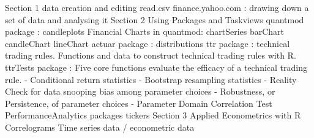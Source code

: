 Section 1
data creation and editing
read.csv
finance.yahoo.com : drawing down a set of data and analysing it
Section 2
Using Packages and Taskviews
quantmod package : candleplots 
Financial Charts in quantmod:
chartSeries
barChart
candleChart
lineChart
actuar package : distributions
ttr package : technical trading rules. Functions and data to construct technical trading rules with R.
ttrTests package : Five core functions evaluate the efficacy of a technical trading rule. - Conditional return statistics - Bootstrap resampling statistics - Reality Check for data snooping bias among parameter choices - Robustness, or Persistence, of parameter choices - Parameter Domain Correlation Test
PerformanceAnalytics packages
tickers
Section 3 Applied Econometrics with R
Correlograms
Time series data / econometric data
